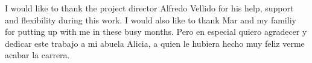 \documentclass[../main.tex]{subfiles}
\begin{document}
I would like to thank the project director Alfredo Vellido for his help, support and flexibility during this work. I would also like to thank Mar and my familiy for putting up with me in these busy months. Pero en especial quiero agradecer y dedicar este trabajo a mi abuela Alicia, a quien le hubiera hecho muy feliz verme acabar la carrera.
\end{document}
